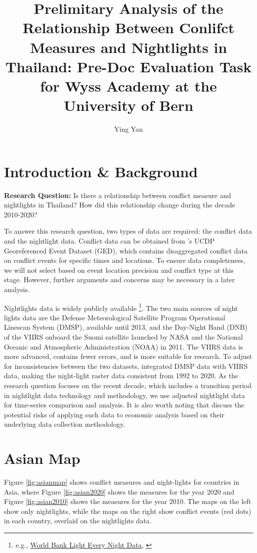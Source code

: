 \documentclass[12pt]{article}
\title{Prelimitary Analysis of the Relationship Between Conlifct Measures and Nightlights in Thailand: Pre-Doc Evaluation Task for Wyss Academy at the University of Bern}
\author{Ying Yan}
\begin{document}
\maketitle

\section*{Introduction \& Background}

\textbf{Research Question:} Is there a relationship between conflict measure and nightlights in Thailand? How did this relationship change during the decade 2010-2020?

To answer this research question, two types of data are required: the conflict data and the nightlight data. Conflict data can be obtained from \textcite{davies_organized_2025}'s UCDP Georeferenced Event Dataset (GED), which contains disaggregated conflict data on conflict events for specific times and locations. To ensure data completeness, we will not select based on event location precision and conflict type at this stage. However, further arguments and concerns may be necessary in a later analysis.

Nightlights data is widely publicly available \footnote{e.g., \href{https://worldbank.github.io/OpenNightLights/wb-light-every-night-readme.html}{World Bank Light Every Night Data}, \textcite{Li2020}}. The two main sources of night lights data are the Defense Meteorological Satellite Program Operational Linescan System (DMSP), available until 2013, and the Day-Night Band (DNB) of the VIIRS onboard the Suomi satellite launched by NASA and the National Oceanic and Atmospheric Administration (NOAA) in 2011. The VIIRS data is more advanced, contains fewer errors, and is more suitable for research. To adjust for inconsistencies between the two datasets, \textcite{Li2020} integrated DMSP data with VIIRS data, making the night-light raster data consistent from 1992 to 2020. As the research question focuses on the recent decade, which includes a transition period in nightlight data technology and methodology, we use \textcite{Li2020} adjusted nightlight data for time-series comparison and analysis. It is also worth noting that \textcite{gibson_night_2020} discuss the potential risks of applying such data to economic analysis based on their underlying data collection methodology.

\newpage
\section{Asian Map}
Figure \ref{fig:asianmap} shows conflict measures and night-lights for countries in Asia, where Figure \ref{fig:asian2020} shows the measures for the year 2020 and Figure \ref{fig:asian2010} shows the measures for the year 2010. The maps on the left show only nightlights, while the maps on the right show conflict events (red dots) in each country, overlaid on the nightlights data.
\end{document}

